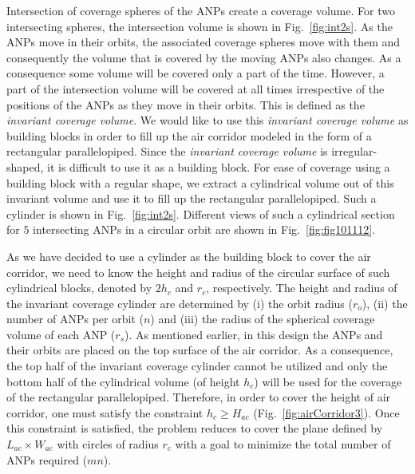 \documentclass[10pt]{IEEEtran}
\begin{document}
Intersection of coverage spheres of the ANPs create a coverage volume. For two intersecting spheres, the intersection volume is shown in Fig.~\ref{fig:int2s}. As the ANPs move in their orbits, the associated coverage spheres move with them and consequently the volume that is covered by the moving ANPs also changes. As a consequence some volume will be covered only a part of the time. However, a part of the intersection volume will be covered at all times irrespective of the positions of the ANPs as they move in their orbits. This is defined as the {\em invariant coverage volume}. We would like to use this {\em invariant coverage volume} as building blocks in order to fill up the air corridor modeled in the form of a rectangular parallelopiped. Since the {\em invariant coverage volume} is irregular-shaped, it is difficult to use it as a building block. For ease of coverage using a  building block with a regular shape, we extract a cylindrical volume out of this invariant volume  and use it to fill up the rectangular parallelopiped. Such a cylinder is shown in Fig.~\ref{fig:int2s}. Different views of such a cylindrical section for $5$ intersecting ANPs in a circular orbit are shown in Fig.~\ref{fig:fig101112}.

As we have decided to use a cylinder as the building block to cover the air corridor, we need to know the 
height and radius of the circular surface of such cylindrical blocks, denoted by $2h_{c}$ and $r_{c}$, respectively. The height and radius of the invariant coverage cylinder are determined by (i) the orbit radius ($r_{o}$), (ii) the number of ANPs per orbit ($n$) and (iii) the radius of the spherical coverage volume of each ANP ($r_{s}$). As mentioned earlier, in this design the ANPs and their orbits are placed on the top surface of the air corridor. As a consequence, the top half of the invariant coverage cylinder cannot be utilized  and only the bottom half of the cylindrical volume (of height $h_{c}$) will be used for the coverage of the rectangular parallelopiped. Therefore, in order to cover the height of air corridor, one must satisfy the constraint $h_{c}\geq H_{ac}$ (Fig.~\ref{fig:airCorridor3}). Once this constraint is satisfied, the problem reduces to cover the plane defined by $L_{ac} \times W_{ac}$ with circles of radius $r_{c}$ with a goal to minimize the total number of ANPs required ($mn$).
\end{document}
